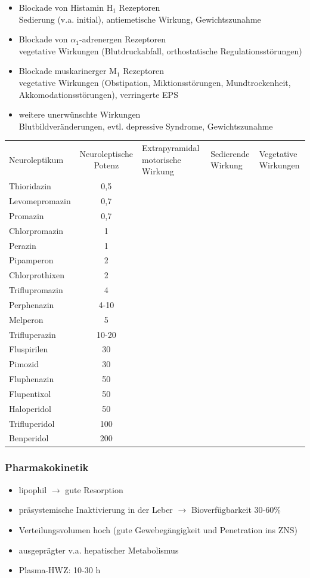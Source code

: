 \documentclass[10pt,a4paper]{report}
\begin{document}
\begin{itemize}
	\item Blockade von Histamin H$_1$ Rezeptoren\\
	Sedierung (v.a. initial), antiemetische Wirkung, Gewichtszunahme
	\item Blockade von $\alpha_1$-adrenergen Rezeptoren\\
	vegetative Wirkungen (Blutdruckabfall, orthostatische Regulationsstörungen)
	\item Blockade muskarinerger M$_1$ Rezeptoren\\
	vegetative Wirkungen (Obstipation, Miktionsstörungen, Mundtrockenheit, 	Akkomodationsstörungen), verringerte EPS
	\item weitere unerwünschte Wirkungen\\
	Blutbildveränderungen, evtl. depressive Syndrome, Gewichtszunahme
\end{itemize}
\begin{tabularx}{\textwidth}{lcXXX}
Neuroleptikum&Neuroleptische Potenz&Extrapyramidal motorische Wirkung&Sedierende Wirkung&Vegetative Wirkungen\\
Thioridazin&0,5\\
Levomepromazin&0,7\\
Promazin&0,7\\
Chlorpromazin&1\\
Perazin&1\\
Pipamperon&2\\
Chlorprothixen&2\\
Triflupromazin&4\\
Perphenazin&4-10\\
Melperon&5\\
Trifluperazin&10-20\\
Fluspirilen&30\\
Pimozid&30\\
Fluphenazin&50\\
Flupentixol&50\\
Haloperidol&50\\
Trifluperidol&100\\
Benperidol&200\\	
\end{tabularx}
\subsubsection{Pharmakokinetik} %
\label{ssub:pharmakokinetik}
\begin{itemize}
 		\item lipophil $\rightarrow$ gute Resorption
	\item präsystemische Inaktivierung in der Leber $\rightarrow$ Bioverfügbarkeit 30-60\%
	\item Verteilungsvolumen hoch (gute Gewebegängigkeit und Penetration ins ZNS)
	\item ausgeprägter v.a. hepatischer Metabolismus
	\item Plasma-HWZ: 10-30 h
\end{itemize} 	
\end{document}
